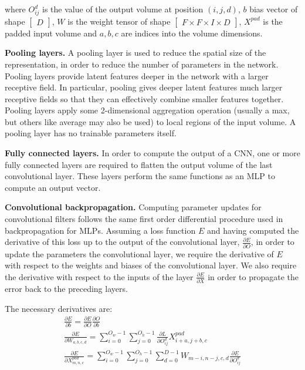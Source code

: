 \noindent where $O_{ij}^d$ is the value of the output volume at position $(i,j,d)$, $b$ bias vector of shape $\left [ \begin{matrix} D \end{matrix} \right]$, $W$ is the weight tensor of shape $\left [ \begin{matrix} F \times F \times I \times D \end{matrix} \right]$, $X^{pad}$ is the padded input volume and $a, b, c$ are indices into the volume dimensions. \par

\noindent \textbf{Pooling layers.} A pooling layer is used to reduce the spatial size of the representation, in order to reduce the number of parameters in the network. Pooling layers provide latent features deeper in the network with a larger receptive field. In particular, pooling gives deeper latent features much larger receptive fields so that they can effectively combine smaller features together. Pooling layers apply some 2-dimensional aggregation operation (usually a max, but others like average may also be used) to local regions of the input volume. A pooling layer has no trainable parameters itself. \par

\noindent \textbf{Fully connected layers.} In order to compute the output of a CNN, one or more fully connected layers are required to flatten the output volume of the last convolutional layer. These layers perform the same functions as an MLP to compute an output vector. \par

\noindent \textbf{Convolutional backpropagation.} Computing parameter updates for convolutional filters follows the same first order differential procedure used in backpropagation for MLPs. Assuming a loss function $ E $ and having computed the derivative of this loss up to the output of the convolutional layer, $ \frac{\partial E} {\partial O} $, in order to update the parameters the convolutional layer, we require the derivative of $ E $ with respect to the weights and biases of the convolutional layer. We also require the derivative with respect to the inputs of the layer $\frac{\partial E} {\partial X}$ in order to propagate the error back to the preceding layers. \par

\noindent The necessary derivatives are:
\unskip
\begin{subequations}
	\begin{gather}
		\frac{\partial E} {\partial b} = \frac{\partial E} {\partial O}\frac{\partial O} {\partial b} \\
		\frac{\partial E} {\partial W_{a,b,c,d}} = \sum_{i=0}^{O_w - 1}\sum_{j=0}^{O_h - 1}\frac{\partial L} {\partial O_{ij}^{d}}X_{i+a,j+b,c}^{pad} \\
		\frac{\partial E} {\partial X_{m,n,c}^{pad}} = \sum_{i=0}^{O_w - 1}\sum_{j=0}^{O_h - 1}\sum_{d=0}^{D - 1}W_{m-i,n-j,c,d}\frac{\partial E} {\partial O_{ij}^{d}}
	\end{gather}
\end{subequations}

